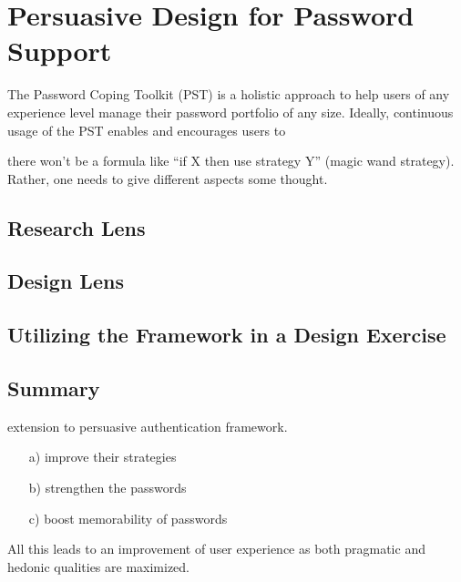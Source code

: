 
\chapter[Persuasive Design for Password Support]{Persuasive Design for Password Support}\label{chap:pst-intro}
The Password Coping Toolkit (PST) is a holistic approach to help users of any experience level manage their password portfolio of any size. Ideally, continuous usage of the PST enables and encourages users to 

there won't be a formula like ``if X then use strategy Y'' (magic wand strategy). Rather, one needs to give different aspects some thought. 




\section{Research Lens}


\section{Design Lens}

\section{Utilizing the Framework in a Design Exercise}


\section{Summary}


extension to persuasive authentication framework. 

\begin{enumerate}
\item[a)] improve their strategies
\item[b)] strengthen the passwords
\item[c)] boost memorability of passwords
\end{enumerate}

All this leads to an improvement of user experience as both pragmatic and hedonic qualities are maximized. 





